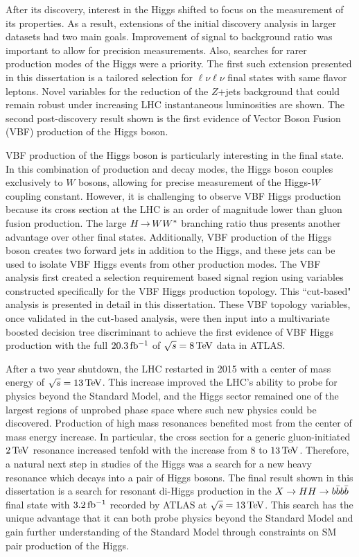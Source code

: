 After its discovery, interest in the Higgs shifted to focus on the measurement of its properties. As a result, extensions of the initial discovery analysis in larger datasets had two main goals. Improvement of signal to background ratio was important to allow for precision measurements. Also, searches for rarer production modes of the Higgs were a priority. The first such extension presented in this dissertation is a tailored selection for $\ell\nu\ell\nu$ final states with same flavor leptons. Novel variables for the reduction of the $Z$+jets background that could remain robust under increasing LHC instantaneous luminosities are shown. The second post-discovery result shown is the first evidence of Vector Boson Fusion (VBF) production of the Higgs boson. 

VBF production of the Higgs boson is particularly interesting in the \HWWfull final state. In this combination of production and decay modes, the Higgs boson couples exclusively to $W$ bosons, allowing for precise measurement of the Higgs-$W$ coupling constant. However, it is challenging to observe VBF Higgs production because its cross section at the LHC is an order of magnitude lower than gluon fusion production. The large $H{\,{\rightarrow}\,}WW^\ast$ branching ratio thus presents another advantage over other final states. Additionally, VBF production of the Higgs boson creates two forward jets in addition to the Higgs, and these jets can be used to isolate VBF Higgs events from other production modes. The VBF \HWWfull analysis first created a selection requirement based signal region using variables constructed specifically for the VBF Higgs production topology. This ``cut-based" analysis is presented in detail in this dissertation. These VBF topology variables, once validated in the cut-based analysis, were then input into a multivariate boosted decision tree discriminant to achieve the first evidence of VBF Higgs production with the full $20.3 \mbox{\,fb$^{-1}$}$ of $\sqrt{s} = 8 \TeV$ data in ATLAS. 

After a two year shutdown, the LHC restarted in 2015 with a center of mass energy of $\sqrt{s} = 13 \TeV$. This increase improved the LHC's ability to probe for physics beyond the Standard Model, and the Higgs sector remained one of the largest regions of unprobed phase space where such new physics could be discovered. Production of high mass resonances benefited most from the center of mass energy increase. In particular, the cross section for a generic gluon-initiated $2 \TeV$ resonance increased tenfold with the increase from $8$ to $13 \TeV$. Therefore, a natural next step in studies of the Higgs was a search for a new heavy resonance which decays into a pair of Higgs bosons. The final result shown in this dissertation is a search for resonant di-Higgs production in the $X\to HH \to b\bar{b}b\bar{b}$ final state with $3.2 \mbox{\,fb$^{-1}$}$ recorded by ATLAS at $\sqrt{s} = 13 \TeV$. This search has the unique advantage that it can both probe physics beyond the Standard Model and gain further understanding of the Standard Model through constraints on SM pair production of the Higgs. 

